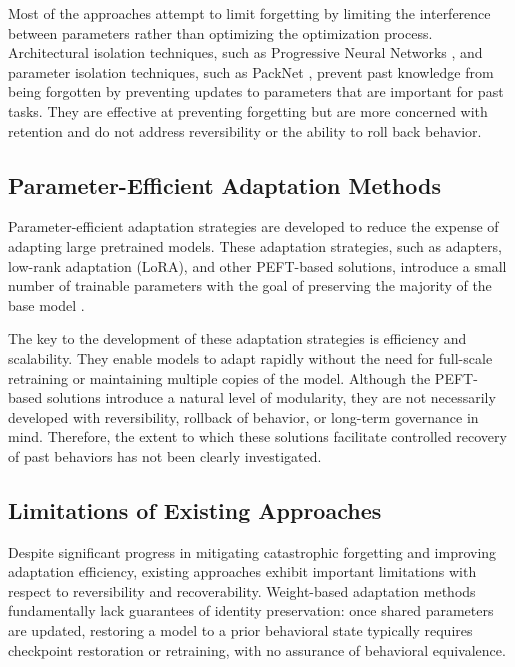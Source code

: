 \documentclass{article}
\begin{document}
	Most of the approaches attempt to limit forgetting by limiting the interference between parameters rather than optimizing the optimization process. Architectural isolation techniques, such as Progressive Neural Networks \cite{rusu2016progressive}, and parameter isolation techniques, such as PackNet \cite{mallya2018packnet}, prevent past knowledge from being forgotten by preventing updates to parameters that are important for past tasks. They are effective at preventing forgetting but are more concerned with retention and do not address reversibility or the ability to roll back behavior.
	
	\subsection{Parameter-Efficient Adaptation Methods}
	\label{sec:peft}
	
	Parameter-efficient adaptation strategies are developed to reduce the expense of adapting large pretrained models. These adaptation strategies, such as adapters, low-rank adaptation (LoRA), and other PEFT-based solutions, introduce a small number of trainable parameters with the goal of preserving the majority of the base model \cite{houlsby2019adapter,hu2021lora}.
	
	The key to the development of these adaptation strategies is efficiency and scalability. They enable models to adapt rapidly without the need for full-scale retraining or maintaining multiple copies of the model. Although the PEFT-based solutions introduce a natural level of modularity, they are not necessarily developed with reversibility, rollback of behavior, or long-term governance in mind. Therefore, the extent to which these solutions facilitate controlled recovery of past behaviors has not been clearly investigated.
	
	\subsection{Limitations of Existing Approaches}
	\label{sec:limitations}
	
	Despite significant progress in mitigating catastrophic forgetting and improving adaptation efficiency, existing approaches exhibit important limitations with respect to reversibility and recoverability. Weight-based adaptation methods fundamentally lack guarantees of identity preservation: once shared parameters are updated, restoring a model to a prior behavioral state typically requires checkpoint restoration or retraining, with no assurance of behavioral equivalence.
	
\end{document}
